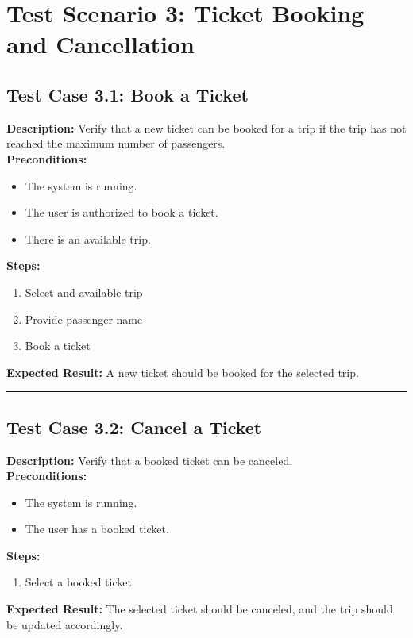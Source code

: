 \documentclass{article}
\begin{document}
\pagebreak

\section{Test Scenario 3: Ticket Booking and Cancellation}
\bigskip
\bigskip
\subsection{Test Case 3.1: Book a Ticket}

\textbf{Description:} Verify that a new ticket can be booked for a trip if the trip has not reached the maximum number of passengers.\\
\textbf{Preconditions:}
\begin{itemize}
  \item The system is running.
  \item The user is authorized to book a ticket.
  \item There is an available trip.
\end{itemize}
\textbf{Steps:}
\begin{enumerate}
  \item Select and available trip
  \item Provide passenger name
  \item Book a ticket
\end{enumerate}
\textbf{Expected Result:}  A new ticket should be booked for the selected trip.

\bigskip
\hrule
\bigskip

\subsection{Test Case 3.2: Cancel a Ticket}

\textbf{Description:} Verify that a booked ticket can be canceled.\\
\textbf{Preconditions:}
\begin{itemize}
  \item The system is running.
  \item The user has a booked ticket.
\end{itemize}
\textbf{Steps:}
\begin{enumerate}
  \item Select a booked ticket
\end{enumerate}
\textbf{Expected Result:} The selected ticket should be canceled, and the trip should be updated accordingly.

\pagebreak
\end{document}
